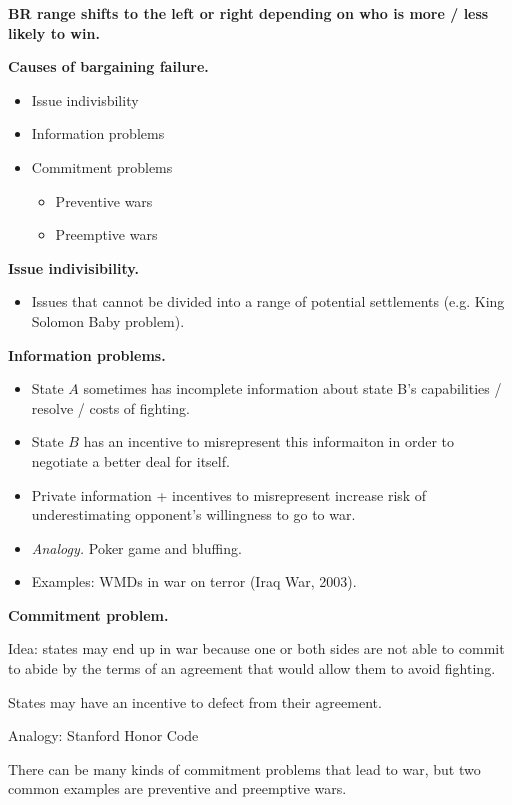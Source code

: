 \documentclass{article}
\begin{document}
{\bf BR range shifts to the left or right depending on who is more / less likely to win.}

{\bf Causes of bargaining failure.}

\begin{itemize}
  \item Issue indivisbility
  \item Information problems
  \item Commitment problems
    \begin{itemize}
      \item Preventive wars
      \item Preemptive wars
    \end{itemize}
\end{itemize}

{\bf Issue indivisibility.}

\begin{itemize}
  \item Issues that cannot be divided into a range of potential settlements (e.g. King Solomon Baby problem).
\end{itemize}

{\bf Information problems.}

\begin{itemize}
  \item State $A$ sometimes has incomplete information about state B's capabilities / resolve / costs of fighting.
  \item State $B$ has an incentive to misrepresent this informaiton in order to negotiate a better deal for itself.
  \item Private information + incentives to misrepresent increase risk of underestimating opponent's willingness to go to war.
  \item {\it Analogy.} Poker game and bluffing.
  \item Examples: WMDs in war on terror (Iraq War, 2003).
\end{itemize}

{\bf Commitment problem.}

Idea: states may end up in war because one or both sides are not able to commit to abide by the terms of an agreement that would allow them to avoid fighting.

States may have an incentive to defect from their agreement.

Analogy: Stanford Honor Code

There can be many kinds of commitment problems that lead to war, but two common examples are preventive and preemptive wars.
\end{document}
